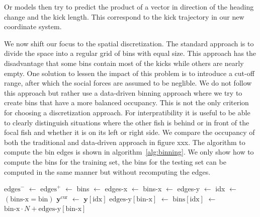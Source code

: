 \documentclass[nobib]{tufte-handout}
\newcommand*\Let[2]{\State #1 \(\gets\) #2}
\begin{document}
Or models then try to predict the product of a vector in direction of the heading change and the kick length.
This correspond to the kick trajectory in our new coordinate system.

We now shift our focus to the spatial discretization.
The standard approach is to divide the space into a regular grid of bins with equal size.
This approach has the disadvantage that some bins contain most of the kicks while others are nearly empty.
One solution to lessen the impact of this problem is to introduce a cut-off range, after which the social forces are assumed to be neglible.
We do not follow this approach but rather use a data-driven binning approach where we try to create bins that have a more balanced occupancy.
This is not the only criterion for choosing a discretization approach.
For interpratibility it is useful to be able to clearly distinguish situations where the other fish is behind or in front of the focal fish and whether it is on its left or right side.
We compare the occupancy of both the traditional and data-driven approach in figure xxx.
The algorithm to compute the bin edges is shown in algorithm~\ref{alg:binning}.
We only show how to compute the bins for the training set, the bins for the testing set can be computed in the same manner but without recomputing the edges.

\MakeRobust{\Call} %
\begin{algorithm}[htb]
  \caption{%
\label{alg:binning}
    Data-driven Spatial Binning}

  \begin{algorithmic}
    \Let{$\text{edges}^-$}{}
    \Let{$\text{edges}^+$}{}
    \State \Return {}
\EndFunction 
{}
\Let{bins}{}
\Let{edges-x}{}
  \Let{bins-x}{}
  \Let{edges-y}{}
  \Let{idx}{$(\text{bins-x} = \text{bin})$}
  \Let{$\bm{y}^{\text{cur}}$}{$\bm{y} [\text{idx}]$}
  \Let{$\text{edges-y}[\text{bin-x}]$}{}
  \Let{$\text{bins}[\text{idx}]$}{$\text{bin-x} \cdot N + \text{edges-y}[\text{bin-x}]$}
\EndFor
{}
\end{algorithmic}
\end{algorithm}
\end{document}
